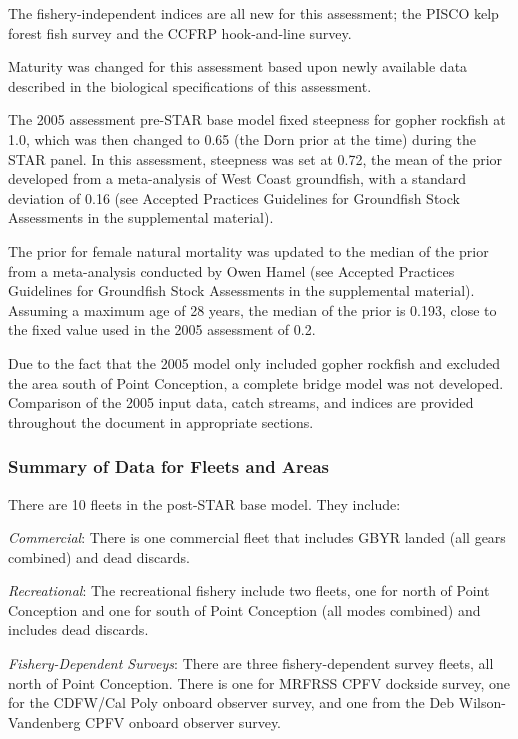 \documentclass[12pt,]{article}
\begin{document}
The fishery-independent indices are all new for this assessment; the
PISCO kelp forest fish survey and the CCFRP hook-and-line survey.

Maturity was changed for this assessment based upon newly available data
described in the biological specifications of this assessment.

The 2005 assessment pre-STAR base model fixed steepness for gopher
rockfish at 1.0, which was then changed to 0.65 (the Dorn prior at the
time) during the STAR panel. In this assessment, steepness was set at
0.72, the mean of the prior developed from a meta-analysis of West Coast
groundfish, with a standard deviation of 0.16 (see Accepted Practices
Guidelines for Groundfish Stock Assessments in the supplemental
material).

The prior for female natural mortality was updated to the median of the
prior from a meta-analysis conducted by Owen Hamel (see Accepted
Practices Guidelines for Groundfish Stock Assessments in the
supplemental material). Assuming a maximum age of 28 years, the median
of the prior is 0.193, close to the fixed value used in the 2005
assessment of 0.2.

Due to the fact that the 2005 model only included gopher rockfish and
excluded the area south of Point Conception, a complete bridge model was
not developed. Comparison of the 2005 input data, catch streams, and
indices are provided throughout the document in appropriate sections.

\subsubsection{Summary of Data for Fleets and
Areas}\label{summary-of-data-for-fleets-and-areas}

There are 10 fleets in the post-STAR base model. They include:

\emph{Commercial}: There is one commercial fleet that includes GBYR
landed (all gears combined) and dead discards.

\emph{Recreational}: The recreational fishery include two fleets, one
for north of Point Conception and one for south of Point Conception (all
modes combined) and includes dead discards.

\emph{Fishery-Dependent Surveys}: There are three fishery-dependent
survey fleets, all north of Point Conception. There is one for MRFRSS
CPFV dockside survey, one for the CDFW/Cal Poly onboard observer survey,
and one from the Deb Wilson-Vandenberg CPFV onboard observer survey.
\end{document}
